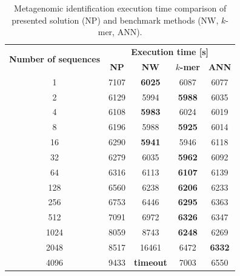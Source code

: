 \documentclass[biomedinformatics,article,submit,moreauthors]{Definitions/mdpi}
\begin{document}
                \begin{table}\centering
                    \caption{Metagenomic identification execution time comparison of presented solution (NP) and benchmark methods (NW, $k$-mer, ANN).}\label{Table:Experiment:Duration}
                    \begin{tabular}{|c||c|c|c|c|}
                        \hline
                        \multirow{2}{*}{\textbf{Number of sequences}} & \multicolumn{4}{|c|}{\textbf{Execution time [s]}} \\
                                        & \textbf{NP} & \textbf{NW} & \textbf{$k$-mer} & \textbf{ANN} \\ \hline \hline
                                        1 & 7107 & \textbf{6025} & 6087 & 6077\\ \hline
                                        2 & 6129 & 5994 & \textbf{5988} & 6035\\ \hline
                                        4 & 6108 & \textbf{5983} & 6024 & 6019\\ \hline
                                        8 & 6196 & 5988 & \textbf{5925} & 6014\\ \hline
                                        16 & 6290 & \textbf{5941} & 5946 & 6118\\ \hline
                                        32 & 6279 & 6035 & \textbf{5962} & 6092\\ \hline
                                        64 & 6316 & 6113 & \textbf{6107} & 6139\\ \hline
                                        128 & 6560 & 6238 & \textbf{6206} & 6233\\ \hline
                                        256 & 6753 & 6446 & \textbf{6295} & 6363\\ \hline
                                        512 & 7091 & 6972 & \textbf{6326} & 6347\\ \hline
                                        1024 & 8059 & 8743 & \textbf{6248} & 6269\\ \hline
                                        2048 & 8517 & 16461 & 6472 & \textbf{6332}\\ \hline
                                        4096 & 9433 & \textbf{timeout} & 7003 & 6550\\ \hline

                    \end{tabular}
                \end{table}
\end{document}
